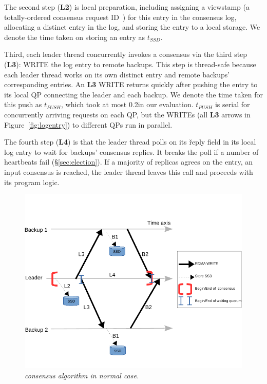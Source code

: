 The second step (\textbf{L2}) is local preparation, including assigning a 
viewstamp (a totally-ordered \paxos consensus request 
ID~\cite{paxos:practical}) 
for this entry in the consensus log, allocating a distinct entry in the log, 
and 
storing the entry to a local storage. We denote the time 
taken on storing an entry as $t_{SSD}$. 

Third, each leader thread concurrently invokes a consensus via the third step 
(\textbf{L3}): WRITE the log entry to remote backups. This step is thread-safe 
because each leader thread works on its own distinct entry and remote backups' 
corresponding entries. An \textbf{L3} WRITE returns quickly after 
pushing the entry to its local QP connecting the leader and each backup. We 
denote the time taken for this push as $t_{PUSH}$, which took at most 0.2\us in 
our evaluation. $t_{PUSH}$ is serial for concurrently arriving requests 
on each QP, but the WRITEs (all \textbf{L3} arrows in 
Figure~\ref{fig:logentry}) to different QPs run in parallel.

The fourth step (\textbf{L4}) is that the leader thread polls on its 
\v{reply} field in its local log entry to wait for backups' consensus replies. 
It breaks the poll if a number of heartbeats fail 
(\S\ref{sec:election}). If a majority of replicas agrees on the entry, an input 
consensus is reached, the 
leader thread leaves this \recv call and proceeds with its program logic.

\begin{figure}[ht]
\begin{center}
\includegraphics{figures/consensus}
\caption{\em \xxx consensus algorithm in normal case.}\label{fig:consensus}
\end{center}
\end{figure}

